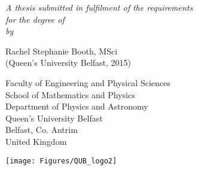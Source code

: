 \documentclass[
12pt, %
oneside, %
english, %
onehalfspacing, %
liststotoc, %
headsepline, %
]{MastersDoctoralThesis} %
\author{Rachel Stephanie \textsc{Booth}} %
\begin{document}
\frontmatter %

\pagestyle{plain} %


\begin{titlepage}
\begin{center}

\vspace*{.06\textheight}
{\textcolor{red}\scshape\LARGE \textbf{\ttitle}\par}\vspace{1.0cm}

\large \textit{A thesis submitted in fulfilment of the requirements\\ for the degree of \degreename}\\[0.2cm]

\vspace*{.01\textheight}
\large \textit{by}
\vspace*{.01\textheight}

\LARGE Rachel Stephanie Booth, MSci \\
\vspace*{.01\textheight}
\LARGE (Queen's University Belfast, 2015)

\vspace*{.02\textheight}

\large Faculty of Engineering and Physical Sciences\\
School of Mathematics and Physics\\Department of Physics and Astronomy\\Queen’s University Belfast\\Belfast, Co. Antrim\\United Kingdom

\vspace*{0.02\textheight}

\texttt{[image: Figures/QUB\_logo2]}

\vspace*{0.02\textheight}
 
\vfill
\end{center}
\end{titlepage}

\end{document}
